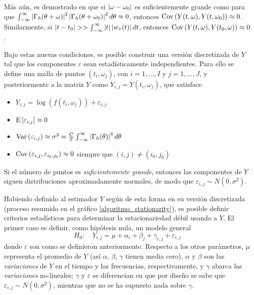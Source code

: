 Más aún, es demostrado en \cite{Priestley66} que si $\left| \omega-\omega_0 \right|$ es suficientemente 
grande como para que 
$\int_{-\infty}^{\infty} \left| \Gamma_h(\theta+\omega) \right|^{2}\left| \Gamma_h(\theta+\omega_0) \right|^{2} d\theta \approx 0$,
entonces 
%
$\mathrm{Cov}\left( Y(t,\omega),Y(t,\omega_0) \right) \approx 0$.
%
Similarmente, si $\left| t-t_0 \right| >> \int_{-\infty}^{\infty} \left| t \right| \left| w_\tau (t) \right| dt $, entonces
%
$\mathrm{Cov}\left( Y(t,\omega),Y(t_0,\omega) \right) \approx 0$.

Bajo estas nuevas condiciones, es posible construir una versión discretizada de $Y$ tal que los 
componentes $\varepsilon$ sean estadísticamente independientes. Para ello se define una malla de 
puntos $(t_i,\omega_j)$, con $i = 1,\dots,I$ y  $j=1,\dots,J$, y posteriormente a la matriz $Y$ 
como $Y_{i,j} = Y(t_i,\omega_j)$, que satisface
%
\begin{itemize}
\item $Y_{i,j} = \log\left(f(t_i,\omega_j)\right) + \varepsilon_{i,j}$
\item $\mathrm{E}\left[ \varepsilon_{i,j} \right] \approx 0$
\item $\mathrm{Var}\left( \varepsilon_{i,j} \right) \approx \sigma^{2} = 
\frac{C}{T} \int_{-\infty}^{\infty} \left| \Gamma_h(\theta) \right|^{4} d\theta$
\item $\mathrm{Cov}\left( \varepsilon_{i,j},\varepsilon_{i_0,j_0} \right) \approx 0$ siempre que $(i,j)\neq (i_0,j_0)$
\end{itemize}

Si el número de puntos es \textit{suficientemente grande}, entonces
las componentes de $Y$ siguen distribuciones aproximadamente normales, de modo que
$\varepsilon_{i,j} \sim N(0,\sigma^{2})$.

Habiendo definido al estimador $Y$ según de esta forma en su versión discretizada (proceso resumido
en el gráfico \ref{algoritmo_stationarity}), es posible definir criterios estadísticos para determinar la 
estacionariedad débil usando a $Y$. El primer caso es definir, como hipótesis nula, un modelo 
general
%
\begin{equation*}
H_0 : \hspace{1em} Y_{i,j} = \mu + \alpha_i + \beta_j + \gamma_{i,j} + \varepsilon_{i,j}
\end{equation*}
%
donde $\varepsilon$ son como se definieron anteriormente. Respecto a los otros parámetros, $\mu$ 
representa el promedio de $Y$ (así $\alpha$, $\beta$, $\gamma$ tienen media cero), $\alpha$ y 
$\beta$ son las \textit{variaciones} de $Y$ en el tiempo y las frecuencias, respectivamente, y 
$\gamma$ abarca las \textit{variaciones} no-lineales; $\gamma$ y $\varepsilon$ se diferencian en 
que por diseño se sabe que $\varepsilon_{i,j} \sim N(0,\sigma^{2})$, mientras que no se ha supuesto 
nada sobre $\gamma$.

